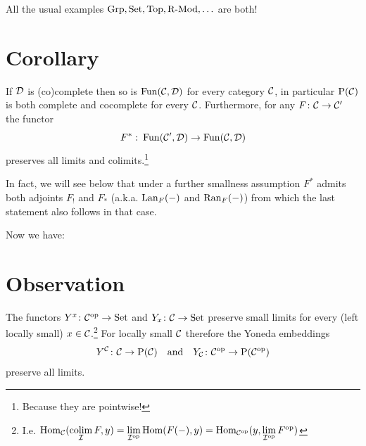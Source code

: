         All the usual examples $\operatorname{Grp}, \operatorname{Set}, \operatorname{Top}, \operatorname{R-Mod}, \ldots$ are both!
    \section{Corollary}\label{chI-39}
        If $\mathcal{D}$ is (co)complete then so is $\operatorname{Fun}(\mathcal{C}, \mathcal{D})$ for every category $\mathcal{C}$, in particular $\mathrm{P}(\mathcal{C})$ is both complete and cocomplete for every $\mathcal{C}$. Furthermore, for any $F \colon \mathcal{C} \to \mathcal{C}'$ the functor
        \begin{equation*}
            F^* \,\colon \operatorname{Fun}(\mathcal{C}', \mathcal{D}) \to \operatorname{Fun}(\mathcal{C}, \mathcal{D})
        \end{equation*}
        preserves all limits and colimits.\footnote{Because they are pointwise!}

        In fact, we will see below that under a further smallness assumption $F^*$ admits both adjoints $F_!$ and $F_*$ (a.k.a. $\operatorname{Lan}_F(-)$ and $\operatorname{Ran}_F(-)$) from which the last statement also follows in that case.
        \medskip

        Now we have:
    \section{Observation}\label{chI-40}
        The functors $Y^x \colon \mathcal{C}^{\operatorname{op}} \to \operatorname{Set}$ and $Y_x \colon \mathcal{C} \to \operatorname{Set}$ preserve small limits for every (left locally small) $x \in \mathcal{C}$.\footnote{I.e. $\operatorname{Hom}_{\mathcal{C}}(\operatorname*{colim}\limits_{\mathcal{I}} F, y) = \lim\limits_{\mathcal{I}^{\operatorname{op}}} \operatorname{Hom}(F(-), y) = \operatorname{Hom}_{\mathcal{C}^{\operatorname{op}}}(y, \lim\limits_{\mathcal{I}^{\operatorname{op}}} F^{\operatorname{op}})$} For locally small $\mathcal{C}$ therefore the Yoneda embeddings
        \begin{equation*}
	       Y^{\mathcal{C}} \colon \mathcal{C} \to \mathrm{P}(\mathcal{C}) \quad \text{and} \quad Y_{\mathcal{C}} \colon \mathcal{C}^{\operatorname{op}} \to \mathrm{P}(\mathcal{C}^{\operatorname{op}})
        \end{equation*}
        preserve all limits.
        \smallskip
        
